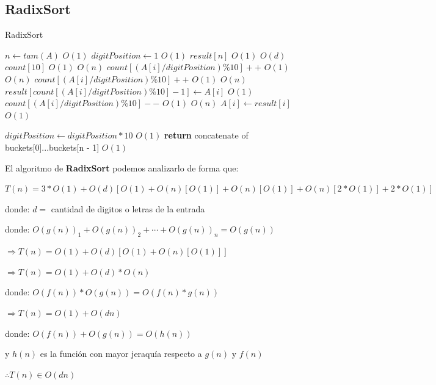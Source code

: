 \documentclass[12pt,twoside]{article}
\begin{document}
\subsection{\textbf{RadixSort}}
\begin{algorithm}
  \caption{RadixSort}\label{euclid}
  \begin{algorithmic}[1]
    \State $n \gets tam(A)$                                                 \Comment $O(1)$
    \State $digitPosition \gets 1$                                          \Comment $O(1)$
    \State $result[n]$                                                      \Comment $O(1)$
                                               \Comment $O(d)$
      \State $count[10]$                                                    \Comment $O(1)$
                                              \Comment $O(n)$
        \State $count[(A[i]/digitPosition) \% 10]++$                        \Comment $O(1)$
      \EndFor                                 
                                              \Comment $O(n)$        
        \State $count[(A[i]/digitPosition) \% 10]++$                        \Comment $O(1)$
      \EndFor
                                            \Comment $O(n)$
        \State $result[count[(A[i]/digitPosition) \% 10] - 1] \gets A[i]$   \Comment $O(1)$
        \State $count[(A[i]/digitPosition) \% 10]--$                        \Comment $O(1)$
      \EndFor
                                              \Comment $O(n)$
        \State $A[i] \gets result[i]$                                       \Comment $O(1)$
      \EndFor

      \State $digitPosition \gets digitPosition*10$                         \Comment $O(1)$
    \EndFor
    \State \textbf{return} concatenate of buckets[0]...buckets[n - 1]       \Comment $O(1)$
  \EndFunction
  \end{algorithmic}
\end{algorithm}

El algoritmo de \textbf{RadixSort} podemos analizarlo de forma que:

\centerline{$T(n) = 3*O(1)+O(d)[O(1) + O(n)[O(1)]+ O(n)[O(1)] + O(n)[2*O(1)] + 2*O(1)]$}
\centerline{}
\centerline{donde: $d = $ cantidad de digitos o letras de la entrada}
\centerline{}
\centerline{donde: $O(g(n))_{1} + O(g(n))_{2}+\cdots+O(g(n))_n = O(g(n))$}
\centerline{}
\centerline{$\Rightarrow T(n) = O(1)+O(d)[O(1) + O(n)[O(1)]]$}
\centerline{}
\centerline{$\Rightarrow T(n) = O(1) + O(d)*O(n)$}
\centerline{}
\centerline{donde: $O(f(n)) * O(g(n))= O(f(n)*g(n))$}
\centerline{}
\centerline{$\Rightarrow T(n) = O(1) + O(dn)$}
\centerline{}
\centerline{donde: $O(f(n)) + O(g(n)) = O(h(n))$}
\centerline{y $h(n)$ es la funci\'on con mayor jeraqu\'ia respecto a $g(n)$ y $f(n)$}
\centerline{}
\centerline{$\therefore T(n) \in O(dn)$}
\end{document}
